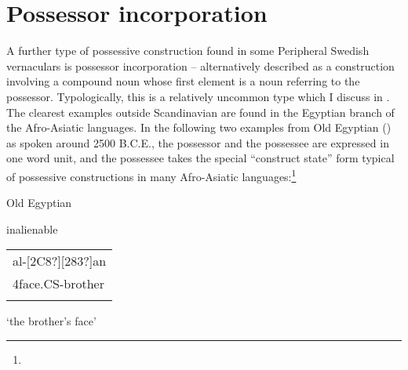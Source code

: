 \section{Possessor incorporation}

\begin{styleBodyTextFirst}
A further type of possessive construction found in some Peripheral Swedish vernaculars is possessor incorporation – alternatively described as a construction involving a compound noun whose first element is a noun referring to the possessor. Typologically, this is a relatively uncommon type which I discuss in \citet{Dahl2004}. The clearest examples outside Scandinavian are found in the Egyptian branch of the Afro-Asiatic languages. In the following two examples from Old Egyptian (\citet{Kammerzell2000}) as spoken around 2500 B.C.E., the possessor and the possessee are expressed in one word unit, and the possessee takes the special “construct state” form typical of possessive constructions in many Afro-Asiatic languages:\footnote{}

\end{styleBodyTextFirst}

\begin{listWWNumileveli}
\item 

\begin{styleExample}
Old Egyptian

\end{styleExample}

\end{listWWNumileveli}

\begin{listWWNumlxxxviiileveli}
\item 

\begin{styleExLtrTbl}
inalienable

\end{styleExLtrTbl}

\end{listWWNumlxxxviiileveli}

\begin{tabular}{l}
\lsptoprule
[127?]al-[2C8?][283?]an\\
4face.CS-brother\\
\lspbottomrule
\end{tabular}

\begin{styleTranslation}
‘the brother’s face’\ \ 

\end{styleTranslation}

